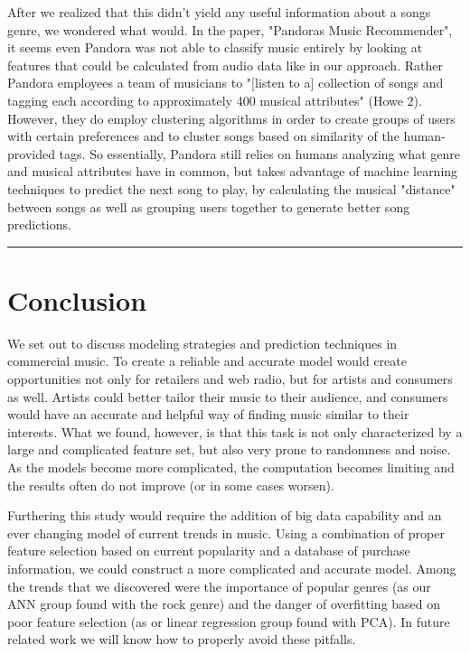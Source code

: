 \documentclass[12pt]{article}
\newcommand{\horizontalLine}{
	\begin{center}
		\hrule width 1.0\textwidth
	\end{center}
}
\begin{document}
After we realized that this didn't yield any useful information about a songs genre, we wondered what would. In the paper, "Pandoras Music
Recommender", it seems even Pandora was not able to classify music entirely by looking at features that could be calculated from audio data like in 
our approach. Rather Pandora employees a team of musicians to "[listen to a] collection of songs and tagging each according to
approximately 400 musical attributes" (Howe 2). However, they do employ clustering algorithms in order to create groups of users with certain preferences and
to cluster songs based on similarity of the human-provided tags.
So essentially, Pandora still relies on humans analyzing what genre and musical attributes have in common, but takes advantage of machine learning techniques
to predict the next song to play, by calculating the musical "distance" between songs as well as grouping users together to generate better song predictions.
\horizontalLine
\section{Conclusion}
\label{sec:conclusion}

We set out to discuss modeling strategies and prediction techniques in commercial music. To create a reliable and accurate model would create opportunities not only for retailers and web radio, but for artists and consumers as well. Artists could better tailor their music to their audience, and consumers would have an accurate and helpful way of finding music similar to their interests. What we found, however, is that this task is not only characterized by a large and complicated feature set, but also very prone to randomness and noise. As the models become more complicated, the computation becomes limiting and the results often do not improve (or in some cases worsen).

Furthering this study would require the addition of big data capability and an ever changing model of current trends in music. Using a combination of proper feature selection based on current popularity and a database of purchase information, we could construct a more complicated and accurate model. Among the trends that we discovered were the importance of popular genres (as our ANN group found with the rock genre) and the danger of overfitting based on poor feature selection (as or linear regression group found with PCA). In future related work we will know how to properly avoid these pitfalls.
\end{document}
